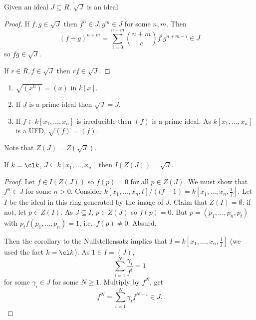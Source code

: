 \documentclass[a4paper]{article}
\begin{document}
\begin{lemma}
  Given an ideal \(J \subseteq R\), \(\sqrt J\) is an ideal.
\end{lemma}

\begin{proof}
  If \(f, g \in \sqrt J\) then \(f^n \in J, g^m \in J\) for some \(n, m\). Then
  \[
    (f + g)^{n + m} = \sum_{i = 0}^{n + m} \binom{n + m}{c} f^i g^{n + m - i} \in J
  \]
  so \(fg \in \sqrt J\).

  If \(r \in R, f \in \sqrt J\) then \(rf \in \sqrt J\).
\end{proof}

\begin{eg}\leavevmode
  \begin{enumerate}
  \item \(\sqrt{(x^n)} = (x)\) in \(k[x]\).
  \item If \(J\) is a prime ideal then \(\sqrt J = J\).
  \item If \(f \in k[x_1, \dots, x_n]\) is irreducible then \((f)\) is a prime ideal. As \(k[x_1, \dots, x_n]\) is a UFD, \(\sqrt{(f)} = (f)\).
  \end{enumerate}
\end{eg}

Note that \(Z(J) = Z(\sqrt J)\).

\begin{theorem}[Nullstellensatz]
  If \(k = \cl k\), \(J \subseteq k[x_1, \dots, x_n]\) then \(I(Z(J)) = \sqrt J\).
\end{theorem}

\begin{proof}
  Let \(f \in I(Z(J))\) so \(f(p) = 0\) for all \(p \in Z(J)\). We must show that \(f^n \in J\) for some \(n > 0\). Consider \(k[x_1, \dots, x_n, t]/(tf - 1) = k[x_1, \dots, x_n, \frac{1}{f}]\). Let \(I\) be the ideal in this ring generated by the image of \(J\). Claim that \(Z(I) = \emptyset\): if not, let \(p \in Z(I)\). As \(J \subseteq I\), \(p \in Z(J)\) so \(f(p) = 0\). But \(p = (p_1, \dots, p_n, p_t)\) with \(p_t f(p_1, \dots, p_n) = 1\), i.e.\ \(f(p) \neq 0\). Absurd.

  Then the corollary to the Nullstellensatz implies that \(I = k[x_1, \dots, x_n, \frac{1}{f}]\) (we used the fact \(k = \cl k\)). As \(1 \in I = (J)\),
  \[
    \sum_{i = 1}^N \frac{\gamma_i}{f^i} = 1
  \]
  for some \(\gamma_i \in J\) for some \(N \geq 1\). Multiply by \(f^N\), get
  \[
    f^N = \sum_{i = 1}^N \gamma_i f^{N -i} \in J.
  \]
\end{proof}
\end{document}
